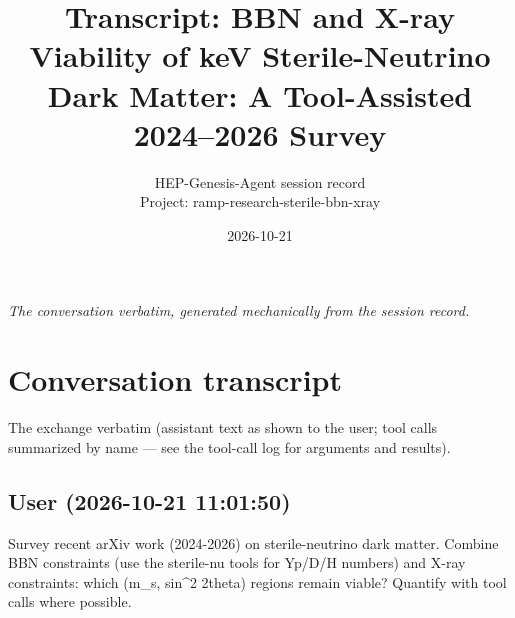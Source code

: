 \documentclass[11pt,a4paper]{article}
\title{Transcript: BBN and X-ray Viability of keV Sterile-Neutrino Dark Matter: A Tool-Assisted 2024--2026 Survey}
\author{HEP-Genesis-Agent session record \\ \small Project: ramp-research-sterile-bbn-xray}
\date{2026-10-21}
\begin{document}
\maketitle
\noindent\textit{\small The conversation verbatim, generated mechanically from the session record.}
\vspace{1em}



\appendix
\section{Conversation transcript}
\label{app:transcript}
The exchange verbatim (assistant text as shown to the user; tool calls summarized by name --- see the tool-call log for arguments and results).
\subsection*{User \small(2026-10-21 11:01:50)}
Survey recent arXiv work (2024-2026) on sterile-neutrino dark matter. Combine BBN constraints (use the sterile-nu tools for Yp/D/H numbers) and X-ray constraints: which (m\_s, sin\textasciicircum{}2 2theta) regions remain viable? Quantify with tool calls where possible.
\end{document}
